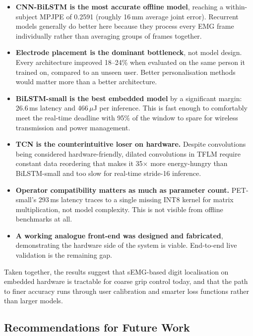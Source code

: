 \documentclass[11pt]{article}
\begin{document}
\begin{itemize}
    \item \textbf{CNN-BiLSTM is the most accurate offline model}, reaching a within-subject MPJPE of 0.2591 (roughly 16\,mm average joint error). Recurrent models generally do better here because they process every EMG frame individually rather than averaging groups of frames together.
    \item \textbf{Electrode placement is the dominant bottleneck}, not model design. Every architecture improved 18--24\% when evaluated on the same person it trained on, compared to an unseen user. Better personalisation methods would matter more than a better architecture.
    \item \textbf{BiLSTM-small is the best embedded model} by a significant margin: 26.6\,ms latency and 466\,$\mu$J per inference. This is fast enough to comfortably meet the real-time deadline with 95\% of the window to spare for wireless transmission and power management.
    \item \textbf{TCN is the counterintuitive loser on hardware.} Despite convolutions being considered hardware-friendly, dilated convolutions in TFLM require constant data reordering that makes it 35$\times$ more energy-hungry than BiLSTM-small and too slow for real-time stride-16 inference.
    \item \textbf{Operator compatibility matters as much as parameter count.} PET-small's 293\,ms latency traces to a single missing INT8 kernel for matrix multiplication, not model complexity. This is not visible from offline benchmarks at all.
    \item \textbf{A working analogue front-end was designed and fabricated}, demonstrating the hardware side of the system is viable. End-to-end live validation is the remaining gap.
\end{itemize}

Taken together, the results suggest that sEMG-based digit localisation on embedded hardware is tractable for coarse grip control today, and that the path to finer accuracy runs through user calibration and smarter loss functions rather than larger models.

\subsection{Recommendations for Future Work}
\end{document}
